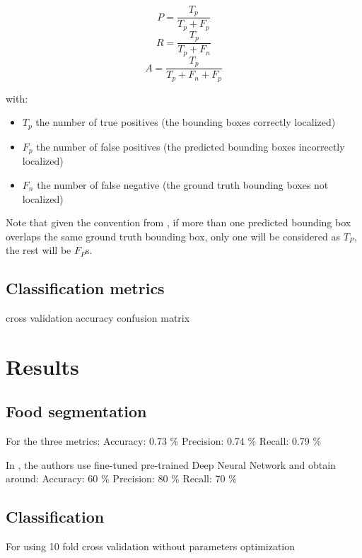 $$ P =  \frac{T_p}{T_p + F_p}$$
$$ R =  \frac{T_p}{T_p + F_n}$$
$$ A = \frac{T_p}{T_p + F_n + F_p} $$

with:
\begin{itemize}
   \item $T_p$ the number of true positives (the bounding boxes correctly localized)
   \item $F_p$ the number of false positives (the predicted bounding boxes incorrectly localized)
   \item $F_n$ the number of false negative (the ground truth bounding boxes not localized)
\end{itemize}

Note that given the convention from \cite{pascalVoc2012}, if more than one predicted bounding box overlaps the same ground truth bounding box, only one will be considered as $T_P$, the rest will be $F_P$s.

\subsection{Classification metrics}

cross validation
accuracy
confusion matrix

\section{Results}
\subsection{Food segmentation}

For the three metrics:
Accuracy: 0.73 \%
Precision: 0.74 \%
Recall:  0.79 \%

In \cite{Bolanos2016}, the authors use fine-tuned pre-trained Deep Neural Network and obtain around:
Accuracy: 60 \%
Precision: 80 \%
Recall: 70 \%

\subsection{Classification}

For using 10 fold cross validation
without parameters optimization

